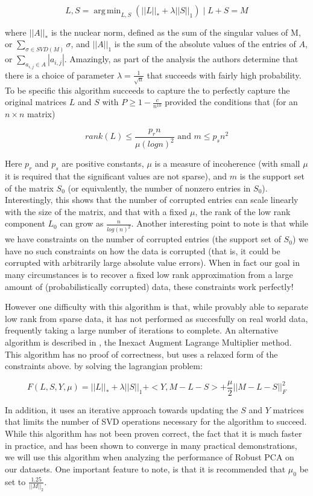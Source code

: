 \documentclass[11pt]{scrartcl} %
\DeclareMathOperator*{\argmin}{arg\,min}
\theoremstyle{plain}
\begin{document}
\[
L, S = \argmin_{L, S}(||L||_* + \lambda ||S||_1) \mid L + S = M
\]

where $||A||_*$ is the nuclear norm, defined as the sum of the singular values of M, or $\sum_{\sigma \in SVD(M)} \sigma$, and $||A||_1$ is the sum of the absolute values of the entries of $A$, or $\sum_{a_{i,j} \in A} |a_{i,j}|$. Amazingly, as part of the analysis the authors determine that there is a choice of parameter $\lambda = \frac{1}{\sqrt{n}}$ that succeeds with fairly high probability. To be specific this algorithm succeeds to capture the to perfectly capture the original matrices $L$ and $S$ with $P \ge 1 - \frac{c}{n^10}$ provided the conditions that (for an $n{\times}n$ matrix)

\[
rank(L) \le \frac{p_r n}{\mu (log n)^2} \text{ and } m \le p_s n^2
\]

Here $p_r$ and $p_s$ are positive constants, $\mu$ is a measure of incoherence\cite{incoherence} (with small $\mu$ it is required that the significant values are not sparse), and $m$ is the support set of the matrix $S_0$ (or equivalently, the number of nonzero entries in $S_0$). Interestingly, this shows that the number of corrupted entries can scale linearly with the size of the matrix, and that with a fixed $\mu$, the rank of the low rank component $L_0$ can grow as $\frac{n}{log(n)^2}$. Another interesting point to note is that while we have constraints on the number of corrupted entries (the support set of $S_0$) we have no such constraints on how the data is corrupted (that is, it could be corrupted with arbitrarily large absolute value errors). When in fact our goal in many circumstances is to recover a fixed low rank approximation from a large amount of (probabilistically corrupted) data, these constraints work perfectly!

However one difficulty with this algorithm is that, while provably able to separate low rank from sparse data, it has not performed as succesfully on real world data, frequently taking a large number of iterations to complete. An alternative algorithm is described in \cite{iaml}, the Inexact Augment Lagrange Multiplier method. This algorithm has no proof of correctness, but uses a relaxed form of the constraints above. by solving the lagrangian problem:

\[
F(L, S, Y, \mu) = ||L||_* + \lambda ||S||_1 + <Y, M - L - S> + \frac{\mu}{2}||M-L-S||_F^2
\]

In addition, it uses an iterative approach towards updating the $S$ and $Y$ matrices that limits the number of SVD operations necessary for the algorithm to succeed. While this algorithm has not been proven correct, the fact that it is much faster in practice, and has been shown to converge in many practical demonstrations, we will use this algorithm when analyzing the performance of Robust PCA on our datasets. One important feature to note, is that it is recommended that $\mu_0$ be set to $\frac{1.25}{||M||_2}$.
\end{document}
